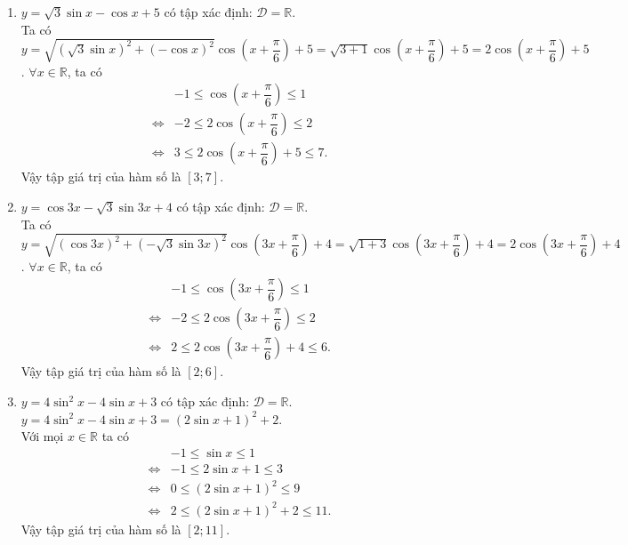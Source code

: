 \begin{bt}
{\begin{enumerate}
\begin{eqnarray*}
			&\Leftrightarrow& 10 \leq 2\cos \left(x+\dfrac{\pi}{3}\right)+12 \leq 14.
		\end{eqnarray*}
		Vậy tập giá trị của hàm số là $[10;14]$.
		\item $y=\sqrt{3} \sin x-\cos x+5$ có tập xác định: $\mathscr{D}=\mathbb{R}$.\\
		Ta có $y=\sqrt{(\sqrt{3} \sin x)^{2}+(-\cos x)^{2}} \cos \left(x+\dfrac{\pi}{6}\right)+5=\sqrt{3+1} \cos \left(x+\dfrac{\pi}{6}\right)+5=2\cos \left(x+\dfrac{\pi}{6}\right)+5$.
		$\forall x \in \mathbb{R}$, ta có
		\begin{eqnarray*}
			&&-1 \leq \cos \left(x+\dfrac{\pi}{6}\right) \leq 1\\
			&\Leftrightarrow& -2 \leq 2\cos \left(x+\dfrac{\pi}{6}\right) \leq 2\\
			&\Leftrightarrow& 3 \leq 2\cos \left(x+\dfrac{\pi}{6}\right)+5 \leq 7.
		\end{eqnarray*}
		Vậy tập giá trị của hàm số là $[3;7]$.
		\item $y=\cos 3x-\sqrt{3} \sin 3x+4$ có tập xác định: $\mathscr{D}=\mathbb{R}$.\\
		Ta có $y=\sqrt{(\cos 3x)^{2}+(-\sqrt{3} \sin 3x)^{2}} \cos \left(3x+\dfrac{\pi}{6}\right)+4=\sqrt{1+3} \cos \left(3x+\dfrac{\pi}{6}\right)+4=2\cos \left(3x+\dfrac{\pi}{6}\right)+4$.
		$\forall x \in \mathbb{R}$, ta có
		\begin{eqnarray*}
			&&-1 \leq \cos \left(3x+\dfrac{\pi}{6}\right) \leq 1\\
			&\Leftrightarrow& -2 \leq 2\cos \left(3x+\dfrac{\pi}{6}\right) \leq 2\\
			&\Leftrightarrow& 2 \leq 2\cos \left(3x+\dfrac{\pi}{6}\right)+4 \leq 6.
		\end{eqnarray*}
		Vậy tập giá trị của hàm số là $[2;6]$.
		\item $y=4 \sin ^{2} x-4 \sin x+3$ có tập xác định: $\mathscr{D}=\mathbb{R}$.\\
		$y=4 \sin ^{2} x-4 \sin x+3=\left(2\sin x+1\right)^2+2$.\\
		Với mọi $x\in \mathbb{R}$ ta có
		\allowdisplaybreaks
		\begin{eqnarray*}
			& & -1\leq \sin x\leq 1\\
			&\Leftrightarrow& -1\leq 2\sin x+1\leq 3\\
			&\Leftrightarrow&0\leq \left( 2\sin x+1\right)^2\leq 9\\
			&\Leftrightarrow&2\leq \left( 2\sin x+1\right)^2+2\leq 11.
		\end{eqnarray*}
		Vậy tập giá trị của hàm số là $[2;11]$.

\end{enumerate}}
\end{bt}
